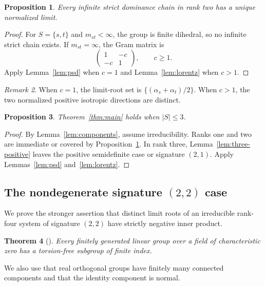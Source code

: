 \documentclass[11pt,reqno]{amsart}
\theoremstyle{plain}
\newtheorem{theorem}{Theorem}[section]
\newtheorem{proposition}[theorem]{Proposition}
\theoremstyle{definition}
\theoremstyle{remark}
\newtheorem{remark}[theorem]{Remark}
\numberwithin{equation}{section}
\begin{document}
\begin{proposition}\label{prop:rank2}
Every infinite strict dominance chain in rank two has a unique normalized limit.
\end{proposition}
\begin{proof}
For $S=\{s,t\}$ and $m_{st}<\infty$, the group is finite dihedral, so no infinite strict chain exists. If $m_{st}=\infty$, the Gram matrix is
\[
\begin{pmatrix}1&-c\\-c&1\end{pmatrix},\qquad c\geq1.
\]
Apply Lemma~\ref{lem:psd} when $c=1$ and Lemma~\ref{lem:lorentz} when $c>1$.
\end{proof}

\begin{remark}
When $c=1$, the limit-root set is $\{(\alpha_s+\alpha_t)/2\}$. When $c>1$, the two normalized positive isotropic directions are distinct.
\end{remark}

\begin{proposition}\label{prop:rank3}
Theorem~\ref{thm:main} holds when $|S|\leq3$.
\end{proposition}
\begin{proof}
By Lemma~\ref{lem:components}, assume irreducibility. Ranks one and two are immediate or covered by Proposition~\ref{prop:rank2}. In rank three, Lemma~\ref{lem:three-positive} leaves the positive semidefinite case or signature $(2,1)$. Apply Lemmas~\ref{lem:psd} and~\ref{lem:lorentz}.
\end{proof}

\subsection{The nondegenerate signature \texorpdfstring{$(2,2)$}{(2,2)} case}

We prove the stronger assertion that distinct limit roots of an irreducible rank-four system of signature $(2,2)$ have strictly negative inner product.

\begin{theorem}[\cite{Selberg1960}]\label{thm:selberg}
Every finitely generated linear group over a field of characteristic zero has a torsion-free subgroup of finite index.
\end{theorem}

We also use that real orthogonal groups have finitely many connected components and that the identity component is normal.
\end{document}
